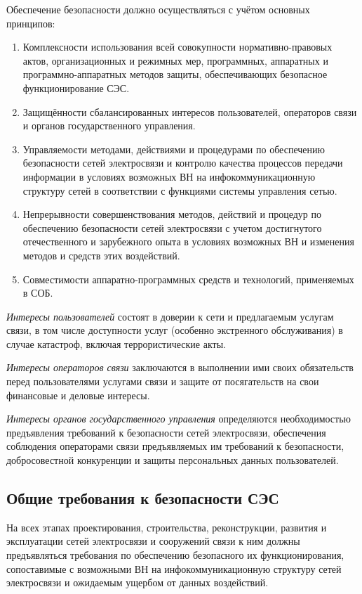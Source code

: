 \documentclass[12pt, russian, oneside, article]{ncc}
\begin{document}
Обеспечение безопасности должно осуществляться с учётом основных принципов:
\begin{enumerate}
\item Комплексности использования всей совокупности нормативно-правовых актов, организационных и режимных мер, программных, аппаратных и программно-аппаратных методов защиты, обеспечивающих безопасное функционирование СЭС.
\item Защищённости сбалансированных интересов пользователей, операторов связи и органов государственного управления.
\item Управляемости методами, действиями и процедурами по обеспечению безопасности сетей электросвязи и контролю качества процессов передачи информации в условиях возможных ВН на инфокоммуникационную структуру сетей в соответствии с функциями системы управления сетью.
\item Непрерывности совершенствования методов, действий и процедур по обеспечению безопасности сетей электросвязи с учетом достигнутого отечественного и зарубежного опыта в условиях возможных ВН и изменения методов и средств этих воздействий.
\item Совместимости аппаратно-программных средств и технологий, применяемых в СОБ.
\end{enumerate}

\emph{Интересы пользователей} состоят в доверии к сети и предлагаемым услугам связи, в том числе доступности услуг (особенно экстренного обслуживания) в случае катастроф, включая террористические акты.

\emph{Интересы операторов связи} заключаются в выполнении ими своих обязательств перед пользователями услугами связи и защите от посягательств на свои финансовые и деловые интересы.

\emph{Интересы органов государственного управления} определяются необходимостью предъявления требований к безопасности сетей электросвязи, обеспечения соблюдения операторами связи предъявляемых им требований к безопасности, добросовестной конкуренции и защиты персональных данных пользователей.
\subsection{Общие требования к безопасности СЭС}
\label{sec-1_5}


На всех этапах проектирования, строительства, реконструкции, развития и эксплуатации сетей электросвязи и сооружений связи к ним должны предъявляться требования по обеспечению безопасного их функционирования, сопоставимые с возможными ВН на инфокоммуникационную структуру сетей электросвязи и ожидаемым ущербом от данных воздействий.
\end{document}
